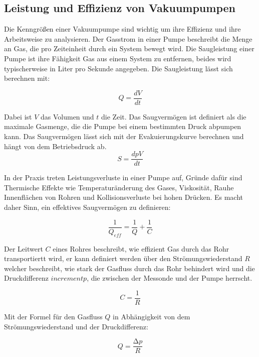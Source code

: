 \subsection{Leistung und Effizienz von Vakuumpumpen}


Die Kenngrößen einer Vakuumpumpe sind wichtig um ihre Effizienz und ihre Arbeitsweise zu analysieren.
Der Gasstrom in einer Pumpe beschreibt die Menge an Gas, die pro Zeiteinheit durch ein System bewegt wird. Die Saugleistung einer Pumpe ist ihre 
Fähigkeit Gas aus einem System zu entfernen, beides wird typischerweise in Liter pro Sekunde angegeben. Die Saugleistung lässt sich berechnen mit:

\begin{equation}
    Q=\frac{dV}{dt}
\end{equation}

Dabei ist \( V \) das Volumen und \( t \) die Zeit.
Das Saugvermögen ist definiert als die maximale Gasmenge, die die Pumpe bei einem bestimmten Druck abpumpen kann. Das Saugvermögen lässt sich 
mit der Evakuierungskurve berechnen und hängt von dem Betriebsdruck ab.
\begin{equation}
    S=\frac{dpV}{dt}
\end{equation} 

In der Praxis treten Leistungsverluste in einer Pumpe auf, Gründe dafür sind Thermische Effekte wie Temperaturänderung des Gases,
Viskosität, Rauhe Innenflächen von Rohren und Kollisionsverluste bei hohen Drücken. Es macht daher Sinn, ein effektives Saugvermögen zu definieren:

\begin{equation}
    \frac{1}{Q_{eff}}=\frac{1}{Q}+\frac{1}{C}
\end{equation}   

Der Leitwert \( C \) eines Rohres beschreibt, wie effizient Gas durch das Rohr transportiertt wird, er kann definiert werden über 
den Strömungswiederstand \( R \) welcher beschreibt, wie stark der Gasfluss durch das Rohr behindert wird 
und die Druckdifferenz \( increment p\), die zwischen der Messonde und der Pumpe herrscht. 

\begin{equation}
    C=\frac{1}{R}
\end{equation}

Mit der Formel für den Gasfluss \( Q \) in Abhängigkeit von dem Strömungswiederstand und der Druckdifferenz:

\begin{equation}
    Q=\frac{\increment p}{R}
\end{equation}

